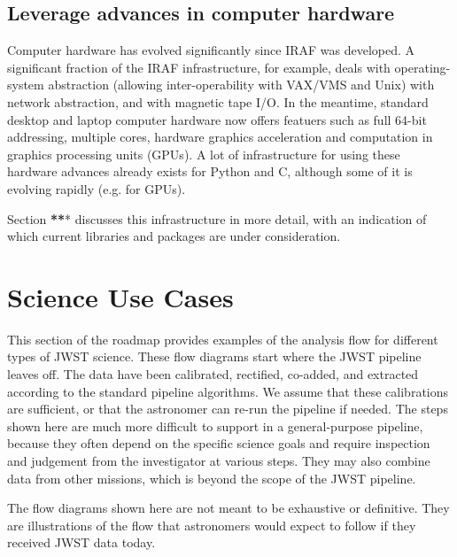 \documentclass[letterpaper,10pt,english]{sphinxmanual}
\begin{document}
\section{Leverage advances in computer hardware}
\label{intro:leverage-advances-in-computer-hardware}
Computer hardware has evolved significantly since IRAF was
developed. A significant fraction of the IRAF infrastructure,
for example, deals with operating-system abstraction (allowing
inter-operability with VAX/VMS and Unix) with network abstraction,
and with magnetic tape I/O. In the meantime, standard desktop and laptop
computer hardware now
offers featuers such as full 64-bit addressing, multiple cores,
hardware graphics acceleration and computation in graphics
processing units (GPUs).  A lot of infrastructure for using these
hardware advances already exists for Python and C, although
some of it is evolving rapidly (e.g. for GPUs).

Section {\color{red}\bfseries{}**}* discusses this infrastructure in more detail, with
an indication of which current libraries and packages are under
consideration.


\chapter{Science Use Cases}
\label{use_cases::doc}\label{use_cases:science-use-cases}
This section of the roadmap provides examples of the analysis flow
for different types of JWST science. These flow diagrams start where the
JWST pipeline leaves off. The data have been calibrated, rectified, co-added,
and extracted according to the standard pipeline algorithms. We assume
that these calibrations are sufficient, or that the astronomer can re-run
the pipeline if needed. The steps shown here are much more difficult to support
in a general-purpose pipeline, because they often depend on the specific science
goals and require inspection and judgement from the investigator at various
steps. They may also combine data from other missions, which is beyond
the scope of the JWST pipeline.

The flow diagrams shown here are not meant to be exhaustive or definitive.
They are illustrations of the flow that astronomers would expect to follow
if they received JWST data today.
\end{document}
